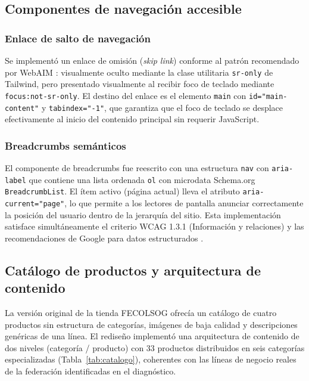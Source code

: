 \documentclass[conference]{IEEEtran}
\begin{document}
\subsection{Componentes de navegación accesible}

\subsubsection{Enlace de salto de navegación}

Se implementó un enlace de omisión (\textit{skip link}) conforme al patrón recomendado por WebAIM \cite{webaim-skip}: visualmente oculto mediante la clase utilitaria \texttt{sr-only} de Tailwind, pero presentado visualmente al recibir foco de teclado mediante \texttt{focus:not-sr-only}. El destino del enlace es el elemento \texttt{main} con \texttt{id="main-content"} y \texttt{tabindex="-1"}, que garantiza que el foco de teclado se desplace efectivamente al inicio del contenido principal sin requerir JavaScript.

\subsubsection{Breadcrumbs semánticos}

El componente de breadcrumbs fue reescrito con una estructura \texttt{nav} con \texttt{aria-label} que contiene una lista ordenada \texttt{ol} con microdata Schema.org \texttt{BreadcrumbList}. El ítem activo (página actual) lleva el atributo \texttt{aria-current="page"}, lo que permite a los lectores de pantalla anunciar correctamente la posición del usuario dentro de la jerarquía del sitio. Esta implementación satisface simultáneamente el criterio WCAG 1.3.1 (Información y relaciones) y las recomendaciones de Google para datos estructurados \cite{google-structured-data}.

\subsection{Catálogo de productos y arquitectura de contenido}

La versión original de la tienda FECOLSOG ofrecía un catálogo de cuatro productos sin estructura de categorías, imágenes de baja calidad y descripciones genéricas de una línea. El rediseño implementó una arquitectura de contenido de dos niveles (categoría / producto) con 33 productos distribuidos en seis categorías especializadas (Tabla~\ref{tab:catalogo}), coherentes con las líneas de negocio reales de la federación identificadas en el diagnóstico.
\end{document}
